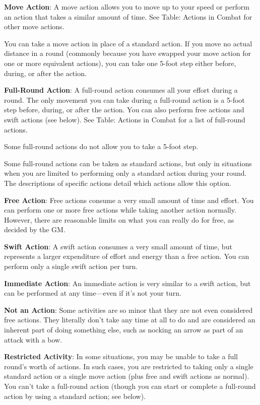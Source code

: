 \textbf{Move Action}: A move action allows you to move up to your speed or perform an action that takes a similar amount of time. See Table: Actions in Combat for other move actions.
				
You can take a move action in place of a standard action. If you move no actual distance in a round (commonly because you have swapped your move action for one or more equivalent actions), you can take one 5-foot step either before, during, or after the action.
				
\textbf{Full-Round Action}: A full-round action consumes all your effort during a round. The only movement you can take during a full-round action is a 5-foot step before, during, or after the action. You can also perform free actions and swift actions (see below). See Table: Actions in Combat for a list of full-round actions.
				
Some full-round actions do not allow you to take a 5-foot step.
				
Some full-round actions can be taken as standard actions, but only in situations when you are limited to performing only a standard action during your round. The descriptions of specific actions detail which actions allow this option.
				
\textbf{Free Action}: Free actions consume a very small amount of time and effort. You can perform one or more free actions while taking another action normally. However, there are reasonable limits on what you can really do for free, as decided by the GM.
				
\textbf{Swift Action}: A swift action consumes a very small amount of time, but represents a larger expenditure of effort and energy than a free action. You can perform only a single swift action per turn.
				
\textbf{Immediate Action}: An immediate action is very similar to a swift action, but can be performed at any time---even if it's not your turn.
				
\textbf{Not an Action}: Some activities are so minor that they are not even considered free actions. They literally don't take any time at all to do and are considered an inherent part of doing something else, such as nocking an arrow as part of an attack with a bow.
				
\textbf{Restricted Activity}: In some situations, you may be unable to take a full round's worth of actions. In such cases, you are restricted to taking only a single standard action or a single move action (plus free and swift actions as normal). You can't take a full-round action (though you can start or complete a full-round action by using a standard action; see below).
				
